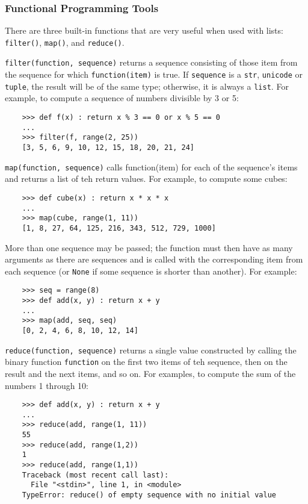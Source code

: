 \documentclass[UTF8]{article}
\begin{document}
\subsubsection{Functional Programming Tools}
There are three built-in functions that are very useful when used with lists: \texttt{filter()},
\texttt{map()}, and \texttt{reduce()}.

\texttt{filter(function, sequence)} returns a sequence consisting of those item from the sequence
for which \texttt{function(item)} is true. If \texttt{sequence} is a \texttt{str}, \texttt{unicode}
or \texttt{tuple}, the result will be of the same type; otherwise, it is always a \texttt{list}.
For example, to compute a sequence of numbers divisible by 3 or 5:
\begin{verbatim}
    >>> def f(x) : return x % 3 == 0 or x % 5 == 0
    ...
    >>> filter(f, range(2, 25))
    [3, 5, 6, 9, 10, 12, 15, 18, 20, 21, 24]
\end{verbatim}

\texttt{map(function, sequence)} calls function(item) for each of the sequence's items and returns
a list of teh return values. For example, to compute some cubes:
\begin{verbatim}
    >>> def cube(x) : return x * x * x
    ...
    >>> map(cube, range(1, 11))
    [1, 8, 27, 64, 125, 216, 343, 512, 729, 1000]
\end{verbatim}

More than one sequence may be passed; the function must then have as many arguments as there are
sequences and is called with the corresponding item from each sequence (or \texttt{None} if some
sequence is shorter than another). For example:
\begin{verbatim}
    >>> seq = range(8)
    >>> def add(x, y) : return x + y
    ...
    >>> map(add, seq, seq)
    [0, 2, 4, 6, 8, 10, 12, 14]
\end{verbatim}

\texttt{reduce(function, sequence)} returns a single value constructed by calling the binary
function \texttt{function} on the first two items of teh sequence, then on the result and the next
items, and so on. For examples, to compute the sum of the numbers 1 through 10:
\begin{verbatim}
    >>> def add(x, y) : return x + y
    ...
    >>> reduce(add, range(1, 11))
    55
    >>> reduce(add, range(1,2))
    1
    >>> reduce(add, range(1,1))
    Traceback (most recent call last):
      File "<stdin>", line 1, in <module>
    TypeError: reduce() of empty sequence with no initial value
\end{verbatim}
\end{document}

